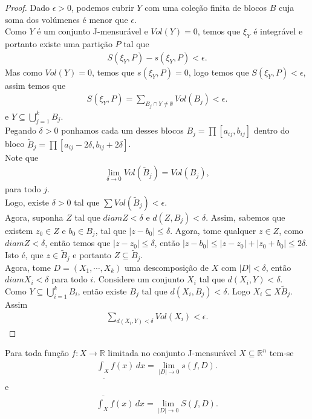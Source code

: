 \begin{proof} 
  Dado $\epsilon>0$, podemos cubrir $Y$ com uma coleção finita de blocos $B$ cuja soma dos volúmenes é menor que $\epsilon.$\\
  Como $Y$ é um conjunto J-mensurável e $Vol(Y)=0$, temos que $\xi_Y$ é integrável e portanto existe uma partição $P$ tal que
  \begin{align*}
    S(\xi_Y,P)-s(\xi_Y,P)<\epsilon.
  \end{align*}
  Mas como $Vol(Y)=0$, temos que $s(\xi_Y,P)=0$, logo temos que $S(\xi_Y,P)<\epsilon$, assim temos que
  \begin{align*}
    S(\xi_Y,P)=\sum_{B_j\cap Y\neq\emptyset}Vol(B_j)<\epsilon.
  \end{align*}
  e $Y\subseteq \bigcup_{j=1}^{k}B_j$.\\
  Pegando $\delta>0$ ponhamos cada um desses blocos $B_j=\prod[a_{ij},b_{ij}]$ dentro do bloco $\tilde{B}_{j}=\prod[a_{ij}-2\delta,b_{ij}+2\delta]$.\\
  Note que
  \begin{align*}
    \lim_{\delta \to 0}Vol(\tilde{B}_{j})=Vol(B_j),
  \end{align*}
  para todo $j$.\\
  Logo, existe $\delta>0$ tal que $\sum Vol(\tilde{B}_{j})<\epsilon$.\\
  Agora, suponha $Z$ tal que $diam Z<\delta$ e $d(Z,B_j)<\delta$. Assim, sabemos que existem $z_0\in Z$ e $b_0\in B_j$, tal que $|z-b_0|\leq \delta$. Agora, tome qualquer $z\in Z$, como $diam Z<\delta$, então temos que $|z-z_0|\leq \delta$, então $|z-b_0|\leq |z-z_0|+|z_0+b_0|\leq 2\delta$.\\
  Isto é, que $z\in \tilde{B}_j$ e portanto $Z\subseteq \tilde{B}_j$.\\
  Agora, tome $D=(X_1,\cdots,X_k)$ uma descomposição de $X$ com $|D|<\delta$, então $diam X_i<\delta$ para todo $i$. Considere um conjunto $X_i$ tal que $d(X_i,Y)<\delta$.\\
  Como $Y\subseteq \bigcup_{i=1}^{k}B_i$, então existe $B_j$ tal que $d(X_i,B_j)<\delta$. Logo $X_i\subseteq X\tilde{B}_j$. Assim
  \begin{align*}
    \sum_{d(X_i,Y)<\delta}Vol(X_i)<\epsilon.
  \end{align*}
\end{proof}
\begin{theorem}
  Para toda função $f:X\to\mathbb{R}$ limitada no conjunto J-mensurável $X\subseteq\mathbb{R}^{n}$ tem-se
  \begin{align*}
    \underline{\int_{X}}f(x)\,dx=\lim_{|D| \to 0}s(f,D).
  \end{align*}
  e
  \begin{align*}
    \overline{\int_{X}}f(x)\,dx=\lim_{|D| \to 0}S(f,D).
  \end{align*}
\end{theorem}
